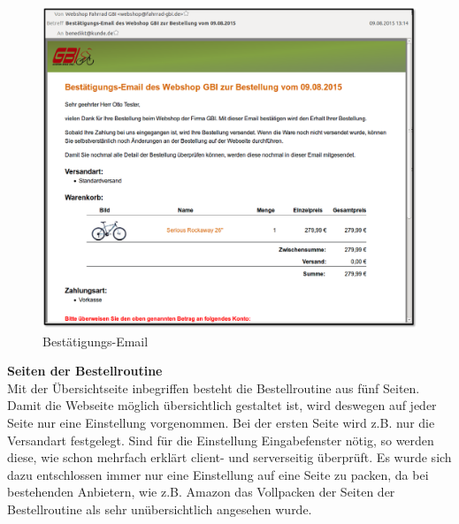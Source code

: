 \begin{figure}[H]
	\begin{center}
			\includegraphics[width=125mm]{Bilder/email.png}
	\end{center}
	\caption{Bestätigungs-Email}
\end{figure}

\textbf{Seiten der Bestellroutine}\\
Mit der Übersichtseite inbegriffen besteht die Bestellroutine aus fünf Seiten. Damit die Webseite möglich übersichtlich gestaltet ist, wird deswegen auf jeder Seite nur eine Einstellung vorgenommen. Bei der ersten Seite wird z.B. nur die Versandart festgelegt. Sind für die Einstellung Eingabefenster nötig, so werden diese, wie schon mehrfach erklärt client- und serverseitig überprüft. Es wurde sich dazu entschlossen immer nur eine Einstellung auf eine Seite zu packen, da bei bestehenden Anbietern, wie z.B. Amazon das \glqq Vollpacken\grqq{} der Seiten der Bestellroutine als sehr unübersichtlich angesehen wurde. 

